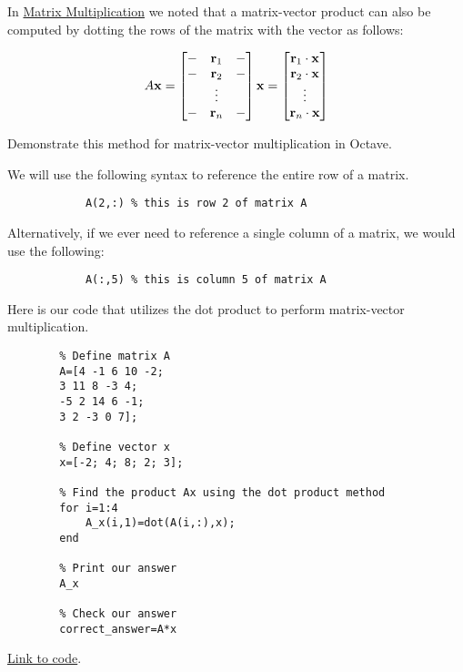 \documentclass{ximera}
\begin{document}
\begin{example}\label{ex_oct_mat_prod_dot}
    In \href{https://ximera.osu.edu/linearalgebradzv3/LinearAlgebraInteractiveIntro/MAT-0020/main}{Matrix Multiplication} we noted that a matrix-vector product can also be computed by dotting the rows of the matrix with the vector as follows:

$$A\mathbf{x}=\begin{bmatrix}-&\mathbf{r}_1&-\\-&\mathbf{r}_2&-\\ &\vdots & \\-&\mathbf{r}_n &-\end{bmatrix}\mathbf{x}=\begin{bmatrix}\mathbf{r}_1\cdot\mathbf{x}\\\mathbf{r}_2\cdot\mathbf{x}\\\vdots\\\mathbf{r}_n\cdot\mathbf{x}\end{bmatrix}$$

Demonstrate this method for matrix-vector multiplication in Octave.
    \begin{explanation}
        We will use the following syntax to reference the entire row of a matrix.
        \begin{verbatim}
            A(2,:) % this is row 2 of matrix A
        \end{verbatim}
        Alternatively, if we ever need to reference a single column of a matrix, we would use the following:
        \begin{verbatim}
            A(:,5) % this is column 5 of matrix A
        \end{verbatim}

    Here is our code that utilizes the dot product to perform matrix-vector multiplication.

    \begin{verbatim}
        % Define matrix A 
        A=[4 -1 6 10 -2;  
        3 11 8 -3 4;  
        -5 2 14 6 -1;  
        3 2 -3 0 7];  
        
        % Define vector x  
        x=[-2; 4; 8; 2; 3];  
        
        % Find the product Ax using the dot product method
        for i=1:4  
            A_x(i,1)=dot(A(i,:),x);  
        end  
        
        % Print our answer  
        A_x  
        
        % Check our answer  
        correct_answer=A*x  
    \end{verbatim}

    \href{https://sagecell.sagemath.org/?z=eJxdj0FLAzEQhe-F_od3KXSlgWZ3raUlh6B49uKpSCmbqRukicxmNT_f2ahFDDnMvO_NG2aBBzr7QLicEvsMi_nMmkMLpbGBXkPVe4jWQGtsoRq0pVe3qKFb8Sj9Y6gnusbdS-nlL_A8ECtXFjh8UJciI080m8MULFnbPaRo_gw9-uCQesI7Rzd2CTZjHHx4LaKL6QoulPro5rOzxHqjd23JkGePeelXujLiXlopd9UqV2UFSfjvpif2ISGOjFMYPoknIKNXft9T9_aPd5FZDjl-K8be5C-N81KK&lang=octave&interacts=eJyLjgUAARUAuQ==}{Link to code}.
    \end{explanation}
\end{example}
\end{document}
